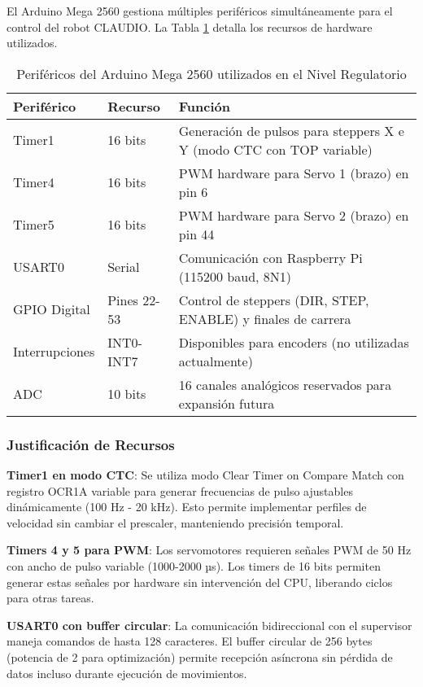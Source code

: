 El Arduino Mega 2560 gestiona múltiples periféricos simultáneamente para el control del robot CLAUDIO. La Tabla \ref{tab:perifericos_regulatorio} detalla los recursos de hardware utilizados.

\begin{table}[H]
\centering
\caption{Periféricos del Arduino Mega 2560 utilizados en el Nivel Regulatorio}
\label{tab:perifericos_regulatorio}
\begin{tabular}{|l|l|p{6cm}|}
\hline
\textbf{Periférico} & \textbf{Recurso} & \textbf{Función} \\
\hline
Timer1 & 16 bits & Generación de pulsos para steppers X e Y (modo CTC con TOP variable) \\
\hline
Timer4 & 16 bits & PWM hardware para Servo 1 (brazo) en pin 6 \\
\hline
Timer5 & 16 bits & PWM hardware para Servo 2 (brazo) en pin 44 \\
\hline
USART0 & Serial & Comunicación con Raspberry Pi (115200 baud, 8N1) \\
\hline
GPIO Digital & Pines 22-53 & Control de steppers (DIR, STEP, ENABLE) y finales de carrera \\
\hline
Interrupciones & INT0-INT7 & Disponibles para encoders (no utilizadas actualmente) \\
\hline
ADC & 10 bits & 16 canales analógicos reservados para expansión futura \\
\hline
\end{tabular}
\end{table}

\subsubsection{Justificación de Recursos}

\textbf{Timer1 en modo CTC}: Se utiliza modo Clear Timer on Compare Match con registro OCR1A variable para generar frecuencias de pulso ajustables dinámicamente (100 Hz - 20 kHz). Esto permite implementar perfiles de velocidad sin cambiar el prescaler, manteniendo precisión temporal.

\textbf{Timers 4 y 5 para PWM}: Los servomotores requieren señales PWM de 50 Hz con ancho de pulso variable (1000-2000 µs). Los timers de 16 bits permiten generar estas señales por hardware sin intervención del CPU, liberando ciclos para otras tareas.

\textbf{USART0 con buffer circular}: La comunicación bidireccional con el supervisor maneja comandos de hasta 128 caracteres. El buffer circular de 256 bytes (potencia de 2 para optimización) permite recepción asíncrona sin pérdida de datos incluso durante ejecución de movimientos.
